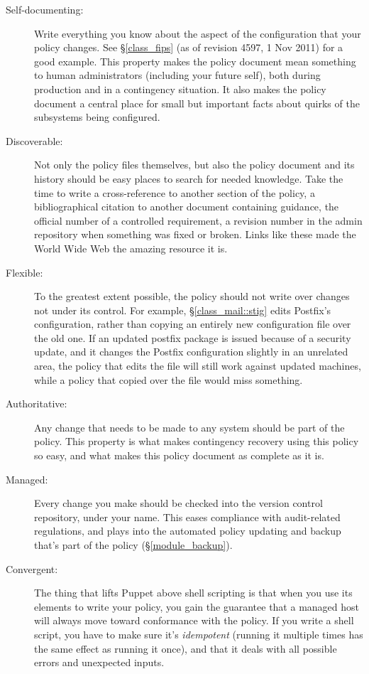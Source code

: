 \begin{description}

\item[Self-documenting:]
Write everything you know about the aspect of the configuration that your
policy changes. See \S\ref{class_fips} (as of revision 4597, 1 Nov 2011)
for a good example. This property makes the policy document mean something
to human administrators (including your future self), both during
production and in a contingency situation. It also makes the policy
document a central place for small but important facts about quirks of the
subsystems being configured.

\item[Discoverable:]
Not only the policy files themselves, but also the policy document and its
history should be easy places to search for needed knowledge. Take the
time to write a cross-reference to another section of the policy, a
bibliographical citation to another document containing guidance, the
official number of a controlled requirement, a revision number in the
admin repository when something was fixed or broken. Links like these made
the World Wide Web the amazing resource it is.

\item[Flexible:]
To the greatest extent possible, the policy should not write over changes
not under its control. For example, \S\ref{class_mail::stig} edits
Postfix's configuration, rather than copying an entirely new configuration
file over the old one. If an updated postfix package is issued because of
a security update, and it changes the Postfix configuration slightly in an
unrelated area, the policy that edits the file will still work against
updated machines, while a policy that copied over the file would miss
something.

\item[Authoritative:]
Any change that needs to be made to any system should be part of the
policy. This property is what makes contingency recovery using this policy
so easy, and what makes this policy document as complete as it is.

\item[Managed:]
Every change you make should be checked into the version control
repository, under your name. This eases compliance with audit-related
regulations, and plays into the automated policy updating and backup
that's part of the policy (\S\ref{module_backup}).

\item[Convergent:]
The thing that lifts Puppet above shell scripting is that when you use its
elements to write your policy, you gain the guarantee that a managed host
will always move toward conformance with the policy. If you write a shell
script, you have to make sure it's \emph{idempotent} (running it multiple
times has the same effect as running it once), and that it deals with all
possible errors and unexpected inputs.

\end{description}







